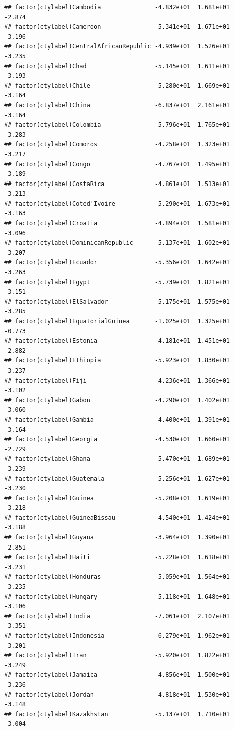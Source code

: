 \documentclass[12pt]{article}\usepackage[]{graphicx}\usepackage[]{color}
\makeatletter
\newenvironment{kframe}{%
 \def\at@end@of@kframe{}%
 \ifinner\ifhmode%
  \def\at@end@of@kframe{\end{minipage}}%
  \begin{minipage}{\columnwidth}%
 \fi\fi%
 \def\FrameCommand##1{\hskip\@totalleftmargin \hskip-\fboxsep
 \colorbox{shadecolor}{##1}\hskip-\fboxsep
     \hskip-\linewidth \hskip-\@totalleftmargin \hskip\columnwidth}%
 \MakeFramed {\advance\hsize-\width
   \@totalleftmargin\z@ \linewidth\hsize
   \@setminipage}}%
 {\par\unskip\endMakeFramed%
 \at@end@of@kframe}
\newenvironment{knitrout}{}{} %
\makeatother
\begin{document}
\begin{knitrout}
\begin{kframe}
\begin{verbatim}
## factor(ctylabel)Cambodia               -4.832e+01  1.681e+01  -2.874
## factor(ctylabel)Cameroon               -5.341e+01  1.671e+01  -3.196
## factor(ctylabel)CentralAfricanRepublic -4.939e+01  1.526e+01  -3.235
## factor(ctylabel)Chad                   -5.145e+01  1.611e+01  -3.193
## factor(ctylabel)Chile                  -5.280e+01  1.669e+01  -3.164
## factor(ctylabel)China                  -6.837e+01  2.161e+01  -3.164
## factor(ctylabel)Colombia               -5.796e+01  1.765e+01  -3.283
## factor(ctylabel)Comoros                -4.258e+01  1.323e+01  -3.217
## factor(ctylabel)Congo                  -4.767e+01  1.495e+01  -3.189
## factor(ctylabel)CostaRica              -4.861e+01  1.513e+01  -3.213
## factor(ctylabel)Coted'Ivoire           -5.290e+01  1.673e+01  -3.163
## factor(ctylabel)Croatia                -4.894e+01  1.581e+01  -3.096
## factor(ctylabel)DominicanRepublic      -5.137e+01  1.602e+01  -3.207
## factor(ctylabel)Ecuador                -5.356e+01  1.642e+01  -3.263
## factor(ctylabel)Egypt                  -5.739e+01  1.821e+01  -3.151
## factor(ctylabel)ElSalvador             -5.175e+01  1.575e+01  -3.285
## factor(ctylabel)EquatorialGuinea       -1.025e+01  1.325e+01  -0.773
## factor(ctylabel)Estonia                -4.181e+01  1.451e+01  -2.882
## factor(ctylabel)Ethiopia               -5.923e+01  1.830e+01  -3.237
## factor(ctylabel)Fiji                   -4.236e+01  1.366e+01  -3.102
## factor(ctylabel)Gabon                  -4.290e+01  1.402e+01  -3.060
## factor(ctylabel)Gambia                 -4.400e+01  1.391e+01  -3.164
## factor(ctylabel)Georgia                -4.530e+01  1.660e+01  -2.729
## factor(ctylabel)Ghana                  -5.470e+01  1.689e+01  -3.239
## factor(ctylabel)Guatemala              -5.256e+01  1.627e+01  -3.230
## factor(ctylabel)Guinea                 -5.208e+01  1.619e+01  -3.218
## factor(ctylabel)GuineaBissau           -4.540e+01  1.424e+01  -3.188
## factor(ctylabel)Guyana                 -3.964e+01  1.390e+01  -2.851
## factor(ctylabel)Haiti                  -5.228e+01  1.618e+01  -3.231
## factor(ctylabel)Honduras               -5.059e+01  1.564e+01  -3.235
## factor(ctylabel)Hungary                -5.118e+01  1.648e+01  -3.106
## factor(ctylabel)India                  -7.061e+01  2.107e+01  -3.351
## factor(ctylabel)Indonesia              -6.279e+01  1.962e+01  -3.201
## factor(ctylabel)Iran                   -5.920e+01  1.822e+01  -3.249
## factor(ctylabel)Jamaica                -4.856e+01  1.500e+01  -3.236
## factor(ctylabel)Jordan                 -4.818e+01  1.530e+01  -3.148
## factor(ctylabel)Kazakhstan             -5.137e+01  1.710e+01  -3.004

\end{verbatim}
\end{kframe}
\end{knitrout}
\end{document}
